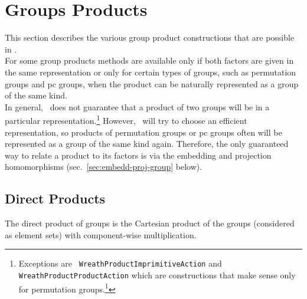 \section{Groups Products\protect\footnotemark}  
\noindent This section describes the various group product constructions that are possible in \gap. 
\\[5pt]
For some group products methods are available only if both factors are
given in the same representation or only for certain types of groups, such as
permutation groups and pc groups, when the product can be naturally represented as a
group of the same kind. 
\\[5pt]
In general, \gap\ does not guarantee that a product of two groups will be in a
particular representation.\footnote{Exceptions are {\tt
    WreathProductImprimitiveAction} and {\tt WreathProductProductAction} which
  are constructions that make sense only for permutation groups.\footnote{{\it
      Ibid.}, sec.~47.4.1.}}  
However, \gap\ will try to choose an efficient representation, so products of
permutation groups or pc groups often will be represented as a group of the same kind
again. 
Therefore, the only guaranteed way to relate a product to its factors is via the
embedding and projection homomorphisms (sec.~\ref{sec:embedd-proj-group} below).

\subsection{Direct Products}
The direct product of groups is the Cartesian product of the groups (considered as element sets) with
component-wise multiplication.


